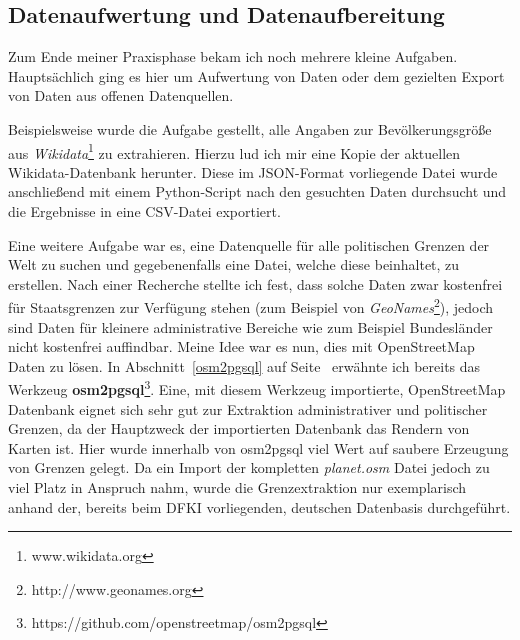 \subsection{Datenaufwertung und Datenaufbereitung}
Zum Ende meiner Praxisphase bekam ich noch mehrere kleine Aufgaben.
Hauptsächlich ging es hier um Aufwertung von Daten oder dem gezielten Export von Daten aus offenen Datenquellen.

Beispielsweise wurde die Aufgabe gestellt, alle Angaben zur Bevölkerungsgröße aus \textit{Wikidata}\footnote{www.wikidata.org} zu extrahieren.
Hierzu lud ich mir eine Kopie der aktuellen Wikidata-Datenbank herunter.
Diese im JSON-Format vorliegende Datei wurde anschließend mit einem Python-Script nach den gesuchten Daten durchsucht und die Ergebnisse in eine CSV-Datei exportiert.

Eine weitere Aufgabe war es, eine Datenquelle für alle politischen Grenzen der Welt zu suchen und gegebenenfalls eine Datei, welche diese beinhaltet, zu erstellen.
Nach einer Recherche stellte ich fest, dass solche Daten zwar kostenfrei für Staatsgrenzen zur Verfügung stehen (zum Beispiel von \textit{GeoNames}\footnote{http://www.geonames.org}), jedoch sind Daten für kleinere administrative Bereiche wie zum Beispiel Bundesländer nicht kostenfrei auffindbar.
Meine Idee war es nun, dies mit OpenStreetMap Daten zu lösen. In Abschnitt~\ref{osm2pgsql} auf Seite~\pageref{osm2pgsql} erwähnte ich bereits das Werkzeug \textbf{osm2pgsql}\footnote{https://github.com/openstreetmap/osm2pgsql}.
Eine, mit diesem Werkzeug importierte, OpenStreetMap Datenbank eignet sich sehr gut zur Extraktion administrativer und politischer Grenzen, da der Hauptzweck der importierten Datenbank das Rendern von Karten ist.
Hier wurde innerhalb von osm2pgsql viel Wert auf saubere Erzeugung von Grenzen gelegt.
Da ein Import der kompletten \textit{planet.osm} Datei jedoch zu viel Platz in Anspruch nahm, wurde die Grenzextraktion nur exemplarisch anhand der, bereits beim DFKI vorliegenden, deutschen Datenbasis durchgeführt.
